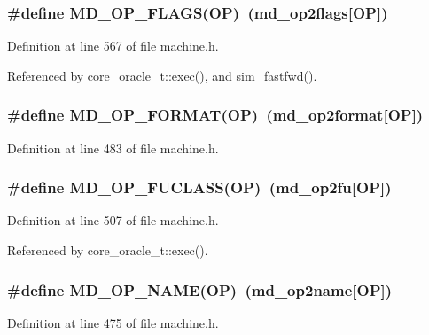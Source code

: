 \subsubsection[{MD\_\-OP\_\-FLAGS}]{\setlength{\rightskip}{0pt plus 5cm}\#define MD\_\-OP\_\-FLAGS(OP)~({\bf md\_\-op2flags}[OP])}\label{machine_8h_9b0f21d8388c386bb4159d06bcf1ed72}




Definition at line 567 of file machine.h.

Referenced by core\_\-oracle\_\-t::exec(), and sim\_\-fastfwd().
\subsubsection[{MD\_\-OP\_\-FORMAT}]{\setlength{\rightskip}{0pt plus 5cm}\#define MD\_\-OP\_\-FORMAT(OP)~({\bf md\_\-op2format}[OP])}\label{machine_8h_47b479aaa31d1ac357dd99df697123d4}




Definition at line 483 of file machine.h.
\subsubsection[{MD\_\-OP\_\-FUCLASS}]{\setlength{\rightskip}{0pt plus 5cm}\#define MD\_\-OP\_\-FUCLASS(OP)~({\bf md\_\-op2fu}[OP])}\label{machine_8h_7f2662286e75066073d89e5490dcfea6}




Definition at line 507 of file machine.h.

Referenced by core\_\-oracle\_\-t::exec().
\subsubsection[{MD\_\-OP\_\-NAME}]{\setlength{\rightskip}{0pt plus 5cm}\#define MD\_\-OP\_\-NAME(OP)~({\bf md\_\-op2name}[OP])}\label{machine_8h_03a40186454ebe507640ff6f7cc076bb}




Definition at line 475 of file machine.h.
